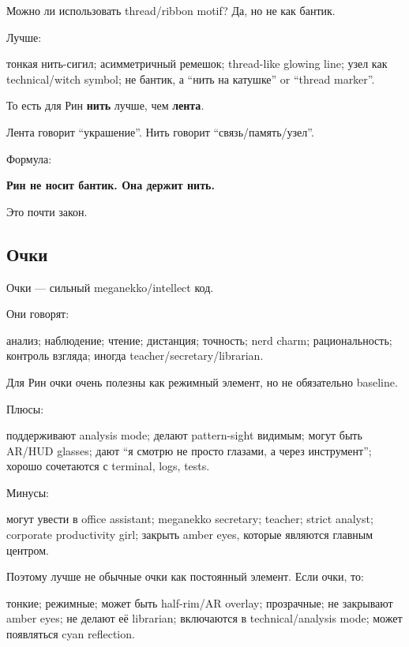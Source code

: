 Можно ли использовать thread/\hspace{0pt}ribbon motif? Да, но не как бантик.

Лучше:

тонкая нить-сигил; асимметричный ремешок; thread-like glowing line; узел
как technical/\hspace{0pt}witch symbol; не бантик, а ``нить на катушке'' or ``thread
marker''.

То есть для Рин \textbf{нить} лучше, чем \textbf{лента}.

Лента говорит ``украшение''. Нить говорит ``связь/\hspace{0pt}память/\hspace{0pt}узел''.

Формула:

\textbf{Рин не носит бантик. Она держит нить.}

Это почти закон.

\subsection*{Очки}

Очки --- сильный meganekko/\hspace{0pt}intellect код.

Они говорят:

анализ; наблюдение; чтение; дистанция; точность; nerd charm;
рациональность; контроль взгляда; иногда teacher/\hspace{0pt}secretary/\hspace{0pt}librarian.

Для Рин очки очень полезны как режимный элемент, но не обязательно
baseline.

Плюсы:

поддерживают analysis mode; делают pattern-sight видимым; могут быть
AR/\hspace{0pt}HUD glasses; дают ``я смотрю не просто глазами, а через инструмент'';
хорошо сочетаются с terminal, logs, tests.

Минусы:

могут увести в office assistant; meganekko secretary; teacher; strict
analyst; corporate productivity girl; закрыть amber eyes, которые
являются главным центром.

Поэтому лучше не обычные очки как постоянный элемент. Если очки, то:

тонкие; режимные; может быть half-rim/\hspace{0pt}AR overlay; прозрачные; не
закрывают amber eyes; не делают её librarian; включаются в
technical/\hspace{0pt}analysis mode; может появляться cyan reflection.

